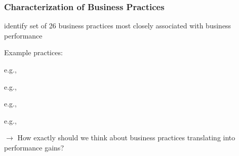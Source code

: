 \documentclass[hideothersubsections, usenames,dvipsnames,11pt]{beamer}
\newenvironment{itemize_2pt}{\itemize\addtolength{\itemsep}{2pt}}{\enditemize}
\newenvironment{enumerate_2pt}{\enumerate\addtolength{\itemsep}{2pt}}{\endenumerate}
\begin{document}
\begin{frame}
\frametitle{Characterization of Business Practices}
	
\begin{itemize_2pt}
	\item \citet{McKenzie2017} identify set of \textcolor{bdf}{26 business practices} most closely associated with business performance
		
	\begin{itemize_2pt}	
	\vspace{0.5em}
	
		\item Example practices:
		
		\begin{enumerate_2pt}
			\item e.g., 
			\item e.g., 
			\item e.g., 
			\item e.g.,  
		\end{enumerate_2pt}		
		
		\vspace{0.5em}	
		
	\end{itemize_2pt}
	
\item[] $\rightarrow$ How exactly should we think about business practices translating into performance gains?
		

	
\end{itemize_2pt}	
	
\end{frame}
\end{document}
